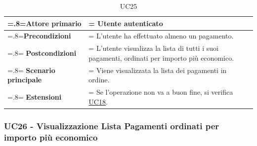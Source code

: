             \begin{table}[H]
                \centering
                \renewcommand{\arraystretch}{1.8}
                \renewcommand\tabularxcolumn[1]{m{#1}}
                \begin{tabularx}{0.9\textwidth} {
                    >{\hsize=.8\hsize\linewidth=\hsize}X
                    >{\hsize=1.2\hsize\linewidth=\hsize}X}
                    \hline
                    \textbf{Attore primario} & Utente autenticato \\
                    \hline
                    \textbf{Precondizioni} & L'utente ha effettuato almeno un pagamento. \\
                    \hline
                    \textbf{Postcondizioni} & L'utente visualizza la lista di tutti i suoi pagamenti, ordinati per importo più economico. \\
                    \hline
                    \textbf{Scenario principale} & Viene visualizzata la lista dei pagamenti in ordine. \\
                    \hline
                    \textbf{Estensioni} & Se l'operazione non va a buon fine, si verifica \hyperref[UC18]{UC18}. \\
                    \hline
                \end{tabularx}
                \caption{UC25}
            \end{table}

        \subsubsection{UC26 - Visualizzazione Lista Pagamenti ordinati per importo più economico}
        \label{UC26}


